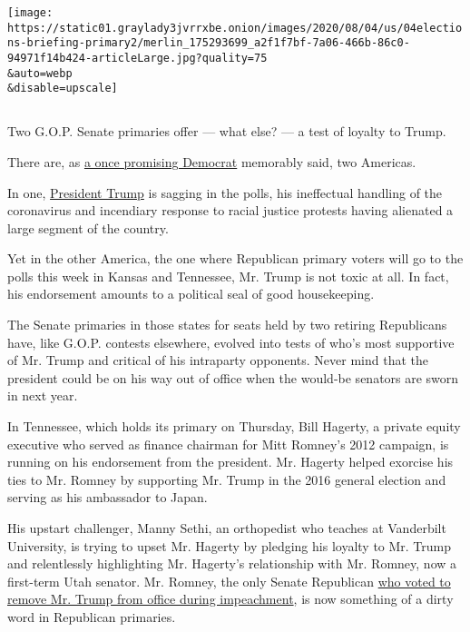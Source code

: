 \texttt{[image: https://static01.graylady3jvrrxbe.onion/images/2020/08/04/us/04elections-briefing-primary2/merlin\_175293699\_a2f1f7bf-7a06-466b-86c0-94971f14b424-articleLarge.jpg?quality=75\\\&auto=webp\\\&disable=upscale]}

\hypertarget{section}{%
\subsection{}\label{section}}

Two G.O.P. Senate primaries offer --- what else? --- a test of loyalty
to Trump.

There are, as
\href{https://www.nytimes3xbfgragh.onion/2004/07/27/politics/campaign/senator-john-edwardss-remarks-to-the-democratic-national.html}{a
once promising Democrat} memorably said, two Americas.

In one,
\href{https://www.nytimes3xbfgragh.onion/interactive/2020/us/elections/donald-trump.html}{President
Trump} is sagging in the polls, his ineffectual handling of the
coronavirus and incendiary response to racial justice protests having
alienated a large segment of the country.

Yet in the other America, the one where Republican primary voters will
go to the polls this week in Kansas and Tennessee, Mr. Trump is not
toxic at all. In fact, his endorsement amounts to a political seal of
good housekeeping.

The Senate primaries in those states for seats held by two retiring
Republicans have, like G.O.P. contests elsewhere, evolved into tests of
who's most supportive of Mr. Trump and critical of his intraparty
opponents. Never mind that the president could be on his way out of
office when the would-be senators are sworn in next year.

In Tennessee, which holds its primary on Thursday, Bill Hagerty, a
private equity executive who served as finance chairman for Mitt
Romney's 2012 campaign, is running on his endorsement from the
president. Mr. Hagerty helped exorcise his ties to Mr. Romney by
supporting Mr. Trump in the 2016 general election and serving as his
ambassador to Japan.

His upstart challenger, Manny Sethi, an orthopedist who teaches at
Vanderbilt University, is trying to upset Mr. Hagerty by pledging his
loyalty to Mr. Trump and relentlessly highlighting Mr. Hagerty's
relationship with Mr. Romney, now a first-term Utah senator. Mr. Romney,
the only Senate Republican
\href{https://www.nytimes3xbfgragh.onion/2020/02/05/us/politics/romney-trump-impeachment.html}{who
voted to remove Mr. Trump from office during impeachment}, is now
something of a dirty word in Republican primaries.

